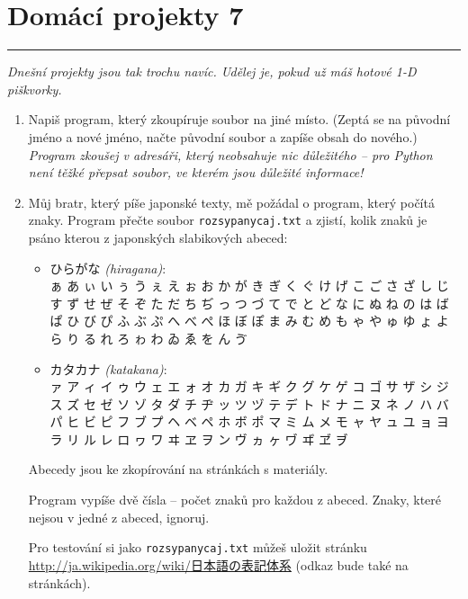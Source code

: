 \documentclass[a4paper,10pt]{article}
\newcommand\plsetno{7}
\newcommand\startsection[1]{
     \vspace{0.2ex}
    \hrule
    {\fontspec{Oxygen} \tiny
     \vspace{-1ex}
     \emph{#1}
     \vspace{-1.5em}
    }
}
\begin{document}
\section*{Domácí projekty \plsetno}

\startsection{Dnešní projekty jsou tak trochu navíc. Udělej je, pokud už máš hotové 1-D piškvorky.}

\begin{enumerate}[resume]

\item
    Napiš program, který zkoupíruje soubor na jiné místo.
    (Zeptá se na původní jméno a nové jméno, načte původní soubor
    a zapíše obsah do nového.)
    \\\emph{\small Program zkoušej v adresáři, který neobsahuje nic
        důležitého – pro Python není těžké přepsat soubor,
        ve kterém jsou důležité informace!}

\item
    Můj bratr, který píše japonské texty, mě požádal o program,
    který počítá znaky.
    Program přečte soubor \verb+rozsypanycaj.txt+ a zjistí,
    kolik znaků je psáno kterou z japonských slabikových abeced:
    \begin{itemize}
    \item { ひらがな \emph{(hiragana)}:
        \\ ぁ あ ぃ い ぅ う ぇ え ぉ お か が き ぎ く
        ぐ け げ こ ご さ ざ し じ す ず せ ぜ そ ぞ た
        だ ち ぢ っ つ づ て で と ど な に ぬ ね の は
        ば ぱ ひ び ぴ ふ ぶ ぷ へ べ ぺ ほ ぼ ぽ ま み
        む め も ゃ や ゅ ゆ ょ よ ら り る れ ろ ゎ わ
        ゐ ゑ を ん ゔ}
    \item { カタカナ \emph{(katakana)}:
        \\ ァ ア ィ イ ゥ ウ ェ エ ォ オ カ ガ キ ギ ク
        グ ケ ゲ コ ゴ サ ザ シ ジ ス ズ セ ゼ ソ ゾ タ
        ダ チ ヂ ッ ツ ヅ テ デ ト ド ナ ニ ヌ ネ ノ ハ
        バ パ ヒ ビ ピ フ ブ プ ヘ ベ ペ ホ ボ ポ マ ミ
        ム メ モ ャ ヤ ュ ユ ョ ヨ ラ リ ル レ ロ ヮ ワ
        ヰ ヱ ヲ ン ヴ ヵ ヶ ヷ ヸ ヹ ヺ}
    \end{itemize}
    Abecedy jsou ke zkopírování na stránkách s materiály.

    Program vypíše dvě čísla – počet znaků pro každou z abeced.
    Znaky, které nejsou v jedné z abeced, ignoruj.

    Pro testování si jako \verb+rozsypanycaj.txt+ můžeš uložit stránku
    \href{http://ja.wikipedia.org/wiki/%E6%97%A5%E6%9C%AC%E8%AA%9E%E3%81%AE%E8%A1%A8%E8%A8%98%E4%BD%93%E7%B3%BB}{
        http://ja.wikipedia.org/wiki/{日本語の表記体系}}
    (odkaz bude také na stránkách).

\end{enumerate}
\end{document}
